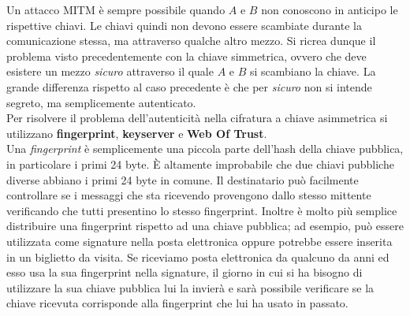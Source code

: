 Un attacco MITM è sempre possibile quando $A$ e $B$ non conoscono in anticipo le rispettive chiavi. Le chiavi quindi non devono essere scambiate durante la comunicazione stessa, ma attraverso qualche altro mezzo. Si ricrea dunque il problema visto precedentemente con la chiave simmetrica, ovvero che deve esistere un mezzo \textit{sicuro} attraverso il quale $A$ e $B$ si scambiano la chiave. La grande differenza rispetto al caso precedente è che per \textit{sicuro} non si intende segreto, ma semplicemente autenticato.\\
Per risolvere il problema dell'autenticità nella cifratura a chiave asimmetrica si utilizzano \textbf{fingerprint}, \textbf{keyserver} e \textbf{Web Of Trust}.\\

Una \textit{fingerprint} è semplicemente una piccola parte dell'hash della chiave pubblica, in particolare i primi 24 byte. È altamente improbabile che due chiavi pubbliche diverse abbiano i primi 24 byte in comune. Il destinatario può facilmente controllare se i messaggi che sta ricevendo provengono dallo stesso mittente verificando che tutti presentino lo stesso fingerprint. Inoltre è molto più semplice distribuire una fingerprint rispetto ad una chiave pubblica; ad esempio, può essere utilizzata come signature nella posta elettronica oppure potrebbe essere inserita in un biglietto da visita. Se riceviamo posta elettronica da qualcuno da anni ed esso usa la sua fingerprint nella signature, il giorno in cui si ha bisogno di utilizzare la sua chiave pubblica lui la invierà e sarà possibile verificare se la chiave ricevuta corrisponde alla fingerprint che lui ha usato in passato.\\

